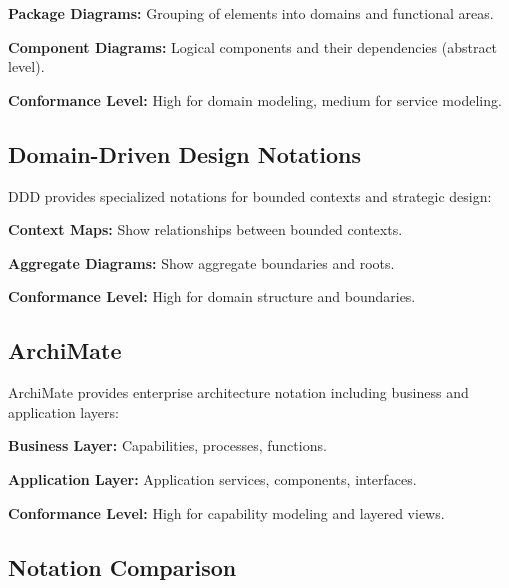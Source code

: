 \documentclass[11pt,letterpaper]{article}
\begin{document}
\textbf{Package Diagrams:} Grouping of elements into domains and functional areas.

\textbf{Component Diagrams:} Logical components and their dependencies (abstract level).

\textbf{Conformance Level:} High for domain modeling, medium for service modeling.

\subsection{Domain-Driven Design Notations}

DDD provides specialized notations for bounded contexts and strategic design:

\textbf{Context Maps:} Show relationships between bounded contexts.

\textbf{Aggregate Diagrams:} Show aggregate boundaries and roots.

\textbf{Conformance Level:} High for domain structure and boundaries.

\subsection{ArchiMate}

ArchiMate provides enterprise architecture notation including business and application layers:

\textbf{Business Layer:} Capabilities, processes, functions.

\textbf{Application Layer:} Application services, components, interfaces.

\textbf{Conformance Level:} High for capability modeling and layered views.

\subsection{Notation Comparison}
\end{document}
